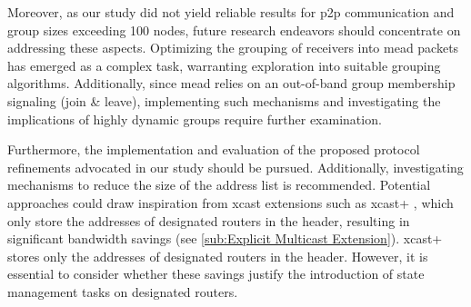 Moreover, as our study did not yield reliable results for \gls{p2p}
    communication and group sizes exceeding 100 nodes, future research
    endeavors should concentrate on addressing these aspects.
Optimizing the grouping of receivers into \gls{mead} packets has emerged as a
    complex task, warranting exploration into suitable grouping algorithms.
Additionally, since \gls{mead} relies on an out-of-band group membership
    signaling (join \& leave), implementing such mechanisms and investigating 
    the implications of highly dynamic groups require further examination.

Furthermore, the implementation and evaluation of the proposed protocol
    refinements advocated in our study should be pursued.
Additionally, investigating mechanisms to reduce the size of the address list
    is recommended.
Potential approaches could draw inspiration from \gls{xcast} extensions such
    as \gls{xcast+} \cite{xcast+}, which only store the addresses of designated
    routers in the header, resulting in significant bandwidth savings (see
    \autoref{sub:Explicit Multicast Extension}).
\gls{xcast+} stores only the addresses of designated routers in the header.
However, it is essential to consider whether these savings justify the
    introduction of state management tasks on designated routers.


